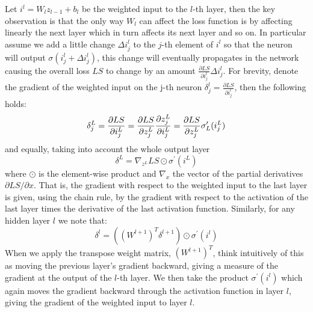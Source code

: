 \documentclass[LaM,binding=0.6cm]{./packages/sapthesis/sapthesis}
\begin{document}
               Let $i^l = W_l z_{l-1} + b_l$ be the weighted input to the $l$-th layer, then the key observation is that the only way $ W_l $ can affect the loss function is by affecting linearly
               the next layer which in turn affects its next layer and so on. In particular assume we add a little change $\Delta i_{j}^{l} $ to the $j$-th 
               element of $ i^l $ so that the neuron will output $ \sigma \left(i_{j}^{l} + \Delta i_{j}^{l}\right) $, this change will
               eventually propagates in the network causing the overall loss $LS$ to change by an amount $\frac{\partial LS}{\partial i_{j}^{l}} \Delta i_{j}^{l}$. For brevity,
               denote the gradient of the weighted input on the j-th neuron $ \delta^{l}_{j} = \frac{\partial LS}{\partial i^{l}_{j}} $, then the following holds:
               \begin{equation}
                 \delta^{L}_{j} = \frac{\partial LS}{\partial i^{L}_{j}} = \frac{\partial LS}{\partial z^{L}_{j}}\frac{\partial z^{L}_{j}}{\partial i^{L}_{j}} \\
                                =\frac{\partial LS}{\partial z^{L}_{j}} \sigma_{L}^{\prime}(i^{L}_{j})
               \end{equation}
               and equally, taking into account the whole output layer
               \begin{equation}
                    \label{bp1}
                    \delta^{L}=\nabla_{z^L} LS \odot \sigma^{\prime}(i^{L})
               \end{equation}
               where $ \odot $ is the element-wise product and $ \nabla_{x} $ the vector of the partial derivatives $ \partial LS / \partial x $. 
               That is, the gradient with respect to the weighted input to the last layer is given, using the chain rule, by the gradient with respect to the activation of the last layer times the derivative
               of the last activation function. Similarly, for any hidden layer $ l $ we note that:
               \begin{equation}
                \label{bp2}
                    \delta^{l}=\left((W^{l+1})^{T} \delta^{l+1}\right) \odot \sigma^{\prime}(i^{l})
                \end{equation}
                When we apply the transpose weight matrix, $(W^{l+1})^{T}$, think intuitively of this as moving the previous layer's gradient backward, giving a measure of the gradient at the output of the $l$-th layer. 
                We then take the product $\sigma^{\prime}(i^{l})$ which again moves the gradient backward through the activation function in layer $l$, giving the gradient of the weighted input to layer $l$.
\end{document}
